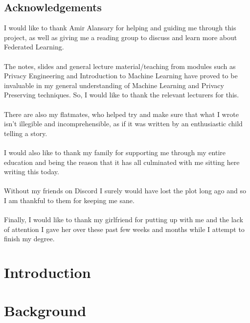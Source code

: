 \documentclass[12pt,twoside]{report}
\begin{document}
\section*{Acknowledgements}
I would like to thank Amir Alansary for helping and guiding me through this project, as well as giving me a reading group to discuss and learn more about Federated Learning.
\\ \\
The notes, slides and general lecture material/teaching from modules such as Privacy Engineering and Introduction to Machine Learning have proved to be invaluable in my general understanding of Machine Learning and Privacy Preserving techniques. So, I would like to thank the relevant lecturers for this.
\\ \\
There are also my flatmates, who helped try and make sure that what I wrote isn't illegible and incomprehensible, as if it was written by an enthusiastic child telling a story.
\\ \\
I would also like to thank my family for supporting me through my entire education and being the reason that it has all culminated with me sitting here writing this today.
\\ \\
Without my friends on Discord I surely would have lost the plot long ago and so I am thankful to them for keeping me sane.
\\ \\
Finally, I would like to thank my girlfriend for putting up with me and the lack of attention I gave her over these past few weeks and months while I attempt to finish my degree.

\clearpage{\pagestyle{empty}}

\tableofcontents 


\clearpage{\pagestyle{empty}}
\setcounter{page}{1}
\fancyhead[LE,RO]{\slshape \rightmark}
\fancyhead[LO,RE]{\slshape \leftmark}

\chapter{Introduction}


\chapter{Background}

\end{document}
